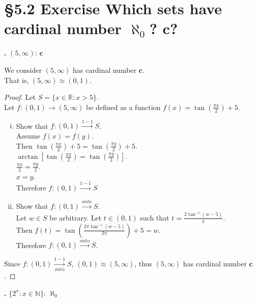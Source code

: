 \documentclass[a4paper,11pt]{article}
\begin{document}
\section*{\S 5.2 Exercise  Which sets have cardinal number \(\aleph_{0}\)? \(\mathbf{ c }\)?}
\setcounter{SubsectionCounter}{2}
\textbf{.} \({(5,\infty)}\): \(\mathbf{c}\)
\begin{theorem1}
We consider \({(5,\infty)}\) has cardinal number \(\mathbf{c}\).\\
That is, \({(5,\infty)} \approx {(0,1)}\).
\begin{proof}
Let \(S = \{x \in \mathbb{R}: x > 5\}\).\\
Let \(f: {(0,1)} \rightarrow {(5,\infty)}\) be defined as a function \(f{(x)}=\tan{(\frac{\pi x}{2})} + 5\).
\begin{enumerate}[(i)]
  \item Show that \(f:{(0,1)} \xrightarrow{1-1} S\).\\
  Assume \(f{(x)} = 
  f{(y)}\).\\
  Then \(\tan{(\frac{\pi x}{2})} + 5 = \tan{(\frac{\pi y}{2})} + 5\).\\
  \(\arctan{[\tan{(\frac{\pi x}{2})} = \tan{(\frac{\pi y}{2})}]}\).\\
  \(\frac{\pi x}{2}=\frac{\pi y}{2}\).\\
  \(x=y\).\\
  Therefore \(f:{(0,1)} \xrightarrow{1-1} S\)
  \item Show that \(f:{(0,1)} \xrightarrow{onto} S\).\\
  Let \(w \in S\) be arbitrary. Let \(t \in {(0,1)}\) such that \(t = \frac{2 \tan^{-1}{(w - 5)}}{\pi}
  \).\\
  Then \(f{(t)} = \tan{(\frac{2\pi\tan^{-1}{(w-5)}}{2\pi})}+5 = w\).\\
  Therefore \(f:{(0,1)} \xrightarrow{onto} S\).
\end{enumerate}
Since \(f:{(0,1)} \xrightarrow[onto]{1-1} S\), \({(0,1)} \approx {(5,\infty)}\), thus \({(5,\infty)}\) has cardinal number \(\mathbf{c}\).
\end{proof}
\end{theorem1}
\newpage
\setcounter{SubsectionCounter}{4}
\noindent\textbf{.} \(\{2^{x}: x \in 
\mathbb{N}\}\): \(\aleph_{0}\)
\end{document}
